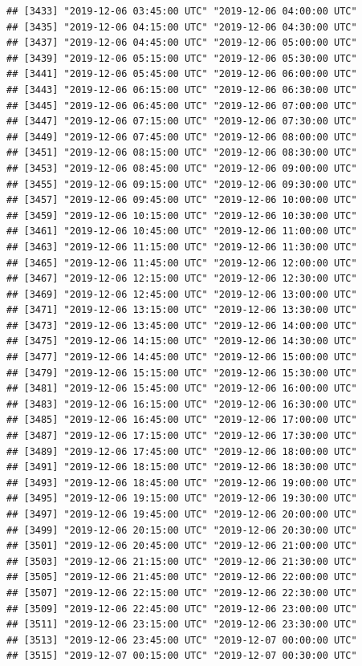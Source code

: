 \documentclass{article}\usepackage[]{graphicx}\usepackage[]{color}
\makeatletter
\newenvironment{kframe}{%
 \def\at@end@of@kframe{}%
 \ifinner\ifhmode%
  \def\at@end@of@kframe{\end{minipage}}%
  \begin{minipage}{\columnwidth}%
 \fi\fi%
 \def\FrameCommand##1{\hskip\@totalleftmargin \hskip-\fboxsep
 \colorbox{shadecolor}{##1}\hskip-\fboxsep
     \hskip-\linewidth \hskip-\@totalleftmargin \hskip\columnwidth}%
 \MakeFramed {\advance\hsize-\width
   \@totalleftmargin\z@ \linewidth\hsize
   \@setminipage}}%
 {\par\unskip\endMakeFramed%
 \at@end@of@kframe}
\newenvironment{knitrout}{}{} %
\makeatother
\begin{document}
\begin{knitrout}
\begin{kframe}
\begin{verbatim}
## [3433] "2019-12-06 03:45:00 UTC" "2019-12-06 04:00:00 UTC"
## [3435] "2019-12-06 04:15:00 UTC" "2019-12-06 04:30:00 UTC"
## [3437] "2019-12-06 04:45:00 UTC" "2019-12-06 05:00:00 UTC"
## [3439] "2019-12-06 05:15:00 UTC" "2019-12-06 05:30:00 UTC"
## [3441] "2019-12-06 05:45:00 UTC" "2019-12-06 06:00:00 UTC"
## [3443] "2019-12-06 06:15:00 UTC" "2019-12-06 06:30:00 UTC"
## [3445] "2019-12-06 06:45:00 UTC" "2019-12-06 07:00:00 UTC"
## [3447] "2019-12-06 07:15:00 UTC" "2019-12-06 07:30:00 UTC"
## [3449] "2019-12-06 07:45:00 UTC" "2019-12-06 08:00:00 UTC"
## [3451] "2019-12-06 08:15:00 UTC" "2019-12-06 08:30:00 UTC"
## [3453] "2019-12-06 08:45:00 UTC" "2019-12-06 09:00:00 UTC"
## [3455] "2019-12-06 09:15:00 UTC" "2019-12-06 09:30:00 UTC"
## [3457] "2019-12-06 09:45:00 UTC" "2019-12-06 10:00:00 UTC"
## [3459] "2019-12-06 10:15:00 UTC" "2019-12-06 10:30:00 UTC"
## [3461] "2019-12-06 10:45:00 UTC" "2019-12-06 11:00:00 UTC"
## [3463] "2019-12-06 11:15:00 UTC" "2019-12-06 11:30:00 UTC"
## [3465] "2019-12-06 11:45:00 UTC" "2019-12-06 12:00:00 UTC"
## [3467] "2019-12-06 12:15:00 UTC" "2019-12-06 12:30:00 UTC"
## [3469] "2019-12-06 12:45:00 UTC" "2019-12-06 13:00:00 UTC"
## [3471] "2019-12-06 13:15:00 UTC" "2019-12-06 13:30:00 UTC"
## [3473] "2019-12-06 13:45:00 UTC" "2019-12-06 14:00:00 UTC"
## [3475] "2019-12-06 14:15:00 UTC" "2019-12-06 14:30:00 UTC"
## [3477] "2019-12-06 14:45:00 UTC" "2019-12-06 15:00:00 UTC"
## [3479] "2019-12-06 15:15:00 UTC" "2019-12-06 15:30:00 UTC"
## [3481] "2019-12-06 15:45:00 UTC" "2019-12-06 16:00:00 UTC"
## [3483] "2019-12-06 16:15:00 UTC" "2019-12-06 16:30:00 UTC"
## [3485] "2019-12-06 16:45:00 UTC" "2019-12-06 17:00:00 UTC"
## [3487] "2019-12-06 17:15:00 UTC" "2019-12-06 17:30:00 UTC"
## [3489] "2019-12-06 17:45:00 UTC" "2019-12-06 18:00:00 UTC"
## [3491] "2019-12-06 18:15:00 UTC" "2019-12-06 18:30:00 UTC"
## [3493] "2019-12-06 18:45:00 UTC" "2019-12-06 19:00:00 UTC"
## [3495] "2019-12-06 19:15:00 UTC" "2019-12-06 19:30:00 UTC"
## [3497] "2019-12-06 19:45:00 UTC" "2019-12-06 20:00:00 UTC"
## [3499] "2019-12-06 20:15:00 UTC" "2019-12-06 20:30:00 UTC"
## [3501] "2019-12-06 20:45:00 UTC" "2019-12-06 21:00:00 UTC"
## [3503] "2019-12-06 21:15:00 UTC" "2019-12-06 21:30:00 UTC"
## [3505] "2019-12-06 21:45:00 UTC" "2019-12-06 22:00:00 UTC"
## [3507] "2019-12-06 22:15:00 UTC" "2019-12-06 22:30:00 UTC"
## [3509] "2019-12-06 22:45:00 UTC" "2019-12-06 23:00:00 UTC"
## [3511] "2019-12-06 23:15:00 UTC" "2019-12-06 23:30:00 UTC"
## [3513] "2019-12-06 23:45:00 UTC" "2019-12-07 00:00:00 UTC"
## [3515] "2019-12-07 00:15:00 UTC" "2019-12-07 00:30:00 UTC"

\end{verbatim}
\end{kframe}
\end{knitrout}
\end{document}
